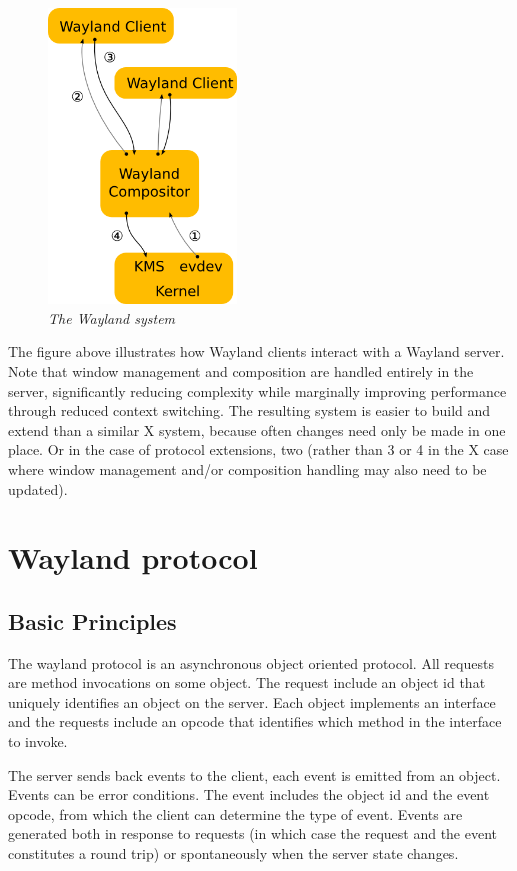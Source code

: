 \documentclass{article}
\begin{document}
\begin{figure}
\begin{center}
\includegraphics[width=50mm]{wayland-architecture.png}
\caption{\small \sl The Wayland system\label{fig:Wayland architecture}}
\end{center}
\end{figure}

The figure above illustrates how Wayland clients interact with a
Wayland server.  Note that window management and composition are
handled entirely in the server, significantly reducing complexity
while marginally improving performance through reduced context
switching.  The resulting system is easier to build and extend than a
similar X system, because often changes need only be made in one
place.  Or in the case of protocol extensions, two (rather than 3 or 4
in the X case where window management and/or composition handling may
also need to be updated).

\section{Wayland protocol}

\subsection{Basic Principles}

The wayland protocol is an asynchronous object oriented protocol.  All
requests are method invocations on some object.  The request include
an object id that uniquely identifies an object on the server.  Each
object implements an interface and the requests include an opcode that
identifies which method in the interface to invoke.

The server sends back events to the client, each event is emitted from
an object.  Events can be error conditions.  The event includes the
object id and the event opcode, from which the client can determine
the type of event.  Events are generated both in response to requests
(in which case the request and the event constitutes a round trip) or
spontaneously when the server state changes.
\end{document}
